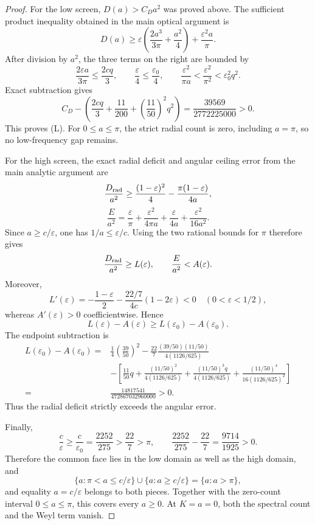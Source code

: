 \documentclass[11pt]{article}
\begin{document}
\begin{proof}
For the low screen, \(D(a)>C_Da^2\) was proved above. The sufficient
product inequality obtained in the main optical argument is
\[
 D(a)\geq
 \varepsilon\left(\frac{2a^3}{3\pi}+\frac{a^2}{4}\right)
 +\frac{\varepsilon^2a}{\pi}.
 \tag{1}
\]
After division by \(a^2\), the three terms on the right are bounded by
\[
 \frac{2\varepsilon a}{3\pi}\leq\frac{2cq}{3},
 \qquad
 \frac{\varepsilon}{4}\leq\frac{\varepsilon_0}{4},
 \qquad
 \frac{\varepsilon^2}{\pi a}<\frac{\varepsilon^2}{\pi^2}
 <\varepsilon_0^2q^2.
\]
Exact subtraction gives
\begin{equation}
 C_D-\left(
 \frac{2cq}{3}+\frac{11}{200}
 +\left(\frac{11}{50}\right)^2q^2
 \right)
 =\frac{39569}{2772225000}>0.
 \label{eq:low-optical-reserve}
\end{equation}
This proves (L). For \(0\leq a\leq\pi\), the strict radial count is zero,
including \(a=\pi\), so no low-frequency gap remains.

For the high screen, the exact radial deficit and angular ceiling error
from the main analytic argument are
\[
 \frac{D_{\rm rad}}{a^2}
 \geq \frac{(1-\varepsilon)^2}{4}
 -\frac{\pi(1-\varepsilon)}{4a},
\]
\[
 \frac{E}{a^2}
 =\frac{\varepsilon}{\pi}
 +\frac{\varepsilon^2}{4\pi a}
 +\frac{\varepsilon}{4a}
 +\frac{\varepsilon^2}{16a^2}.
\]
Since \(a\geq c/\varepsilon\), one has \(1/a\leq\varepsilon/c\).
Using the two rational bounds for \(\pi\) therefore gives
\[
 \frac{D_{\rm rad}}{a^2}\geq L(\varepsilon),
 \qquad
 \frac{E}{a^2}<A(\varepsilon).
\]
Moreover,
\[
 L'(\varepsilon)
 =-\frac{1-\varepsilon}{2}
 -\frac{22/7}{4c}(1-2\varepsilon)<0
 \quad(0<\varepsilon<1/2),
\]
whereas \(A'(\varepsilon)>0\) coefficientwise. Hence
\[
 L(\varepsilon)-A(\varepsilon)
 \geq L(\varepsilon_0)-A(\varepsilon_0).
\]
The endpoint subtraction is
\begin{equation}
\begin{aligned}
 L(\varepsilon_0)-A(\varepsilon_0)
 ={}&
 \frac14\left(\frac{39}{50}\right)^2
 -\frac{22}{7}
  \frac{(39/50)(11/50)}{4(1126/625)}\\
 &-\left[
 \frac{11}{50}q
 +\frac{(11/50)^2}{4(1126/625)}
 +\frac{(11/50)^3q}{4(1126/625)}
 +\frac{(11/50)^4}{16(1126/625)^2}
 \right]\\
 ={}&\frac{14817541}{472867032960000}>0.
\end{aligned}
\label{eq:high-optical-reserve}
\end{equation}
Thus the radial deficit strictly exceeds the angular error.

Finally,
\[
 \frac{c}{\varepsilon}\geq\frac{c}{\varepsilon_0}
 =\frac{2252}{275}>\frac{22}{7}>\pi,
 \qquad
 \frac{2252}{275}-\frac{22}{7}
 =\frac{9714}{1925}>0.
\]
Therefore the common face lies in the low domain as well as the high
domain, and
\[
 \{a:\pi<a\leq c/\varepsilon\}
 \cup\{a:a\geq c/\varepsilon\}
 =\{a:a>\pi\},
\]
and equality \(a=c/\varepsilon\) belongs to both pieces. Together with the
zero-count interval \(0\leq a\leq\pi\), this covers every \(a\geq0\).
At \(K=a=0\), both the spectral count and the Weyl term vanish.
\end{proof}
\end{document}
